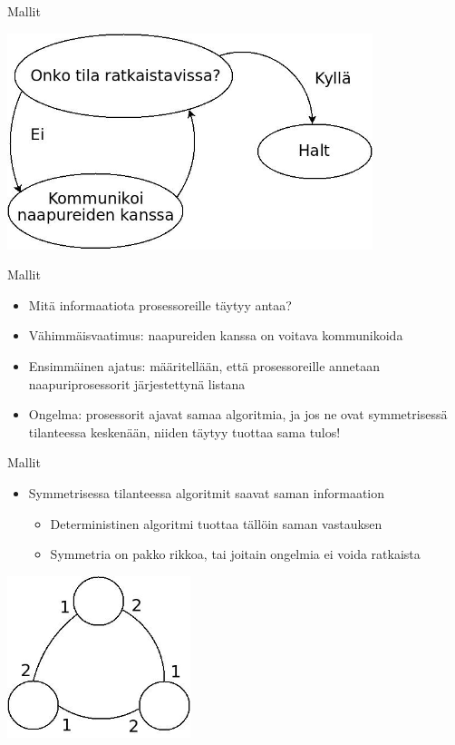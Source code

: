 \documentclass[a4paper, 12pt, finnish]{beamer}
\begin{document}
\begin{frame}{Mallit}
    \begin{center} 
        \includegraphics[width=0.8\textwidth]{Diagram2n.jpeg} 
    \end{center} 
\end{frame}

\begin{frame}{Mallit}
    \begin{itemize}
        \item Mitä informaatiota prosessoreille täytyy antaa?
        \pause
        \item Vähimmäisvaatimus: naapureiden kanssa on voitava kommunikoida
        \item Ensimmäinen ajatus: määritellään, että prosessoreille annetaan naapuriprosessorit järjestettynä listana
        \pause
        \item Ongelma: prosessorit ajavat samaa algoritmia, ja jos ne ovat symmetrisessä tilanteessa keskenään, niiden täytyy tuottaa sama tulos!
    \end{itemize}
\end{frame}

\begin{frame}{Mallit}
    \begin{itemize}
        \item Symmetrisessa tilanteessa algoritmit saavat saman informaation
        \begin{itemize}
            \item Deterministinen algoritmi tuottaa tällöin saman vastauksen
            \item Symmetria on pakko rikkoa, tai joitain ongelmia ei voida ratkaista
        \end{itemize}
    \end{itemize}
    \begin{center}
        \includegraphics[width=0.4\textwidth]{symmetria.jpeg} 
    \end{center}
\end{frame}
\end{document}
